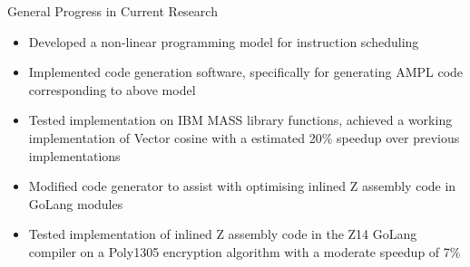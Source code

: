 \documentclass{beamer}
\begin{document}
\begin{darkframes}
\begin{frame}{General Progress in Current Research}

\begin{itemize}
 \item Developed a non-linear programming model for instruction scheduling 
 \pause
 \item Implemented code generation software, specifically for generating AMPL code corresponding to above model 
 \pause
 \item Tested implementation on IBM MASS library functions, achieved a working implementation of Vector cosine with a estimated 20\% speedup over previous implementations
 \pause
 \item Modified code generator to assist with optimising inlined Z assembly code in GoLang modules
 \pause
 \item Tested implementation of inlined Z assembly code in the Z14 GoLang compiler on a Poly1305 encryption algorithm with a moderate speedup of 7\%
\end{itemize}

\end{frame}

  \end{darkframes}
\end{document}
